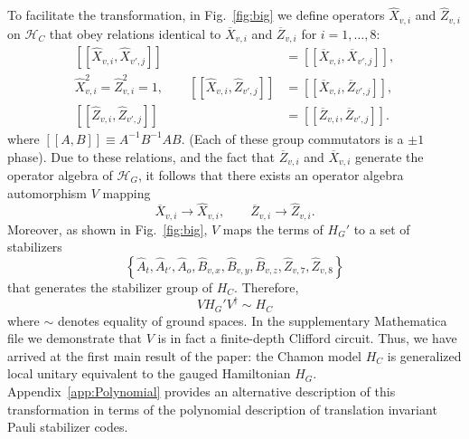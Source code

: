 \documentclass[prx,twocolumn,superscriptaddress,nofootinbib,showpacs,notitlepage]{revtex4-2}
\newcommand{\Chamon}{Chamon }
\begin{document}
To facilitate the transformation, in Fig.~\ref{fig:big} we define operators $\widehat{X}_{v,i}$ and $\widehat{Z}_{v,i}$ on $\mathcal{H}_C$ that obey relations identical to $\overline{X}_{v,i}$ and $\overline{Z}_{v,i}$ for $i=1,\ldots,8$:
\begin{equation}
\begin{split}
    [[\widehat{X}_{v,i},\widehat{X}_{v',j}]]&=[[\overline{X}_{v,i},\overline{X}_{v',j}]],\\
    \widehat{X}_{v,i}^2=\widehat{Z}_{v,i}^2=1,\qquad
    [[\widehat{X}_{v,i},\widehat{Z}_{v',j}]]&=[[\overline{X}_{v,i},\overline{Z}_{v',j}]],\\
    [[\widehat{Z}_{v,i},\widehat{Z}_{v',j}]]&=[[\overline{Z}_{v,i},\overline{Z}_{v',j}]].
\end{split}
\end{equation}
where $[[A,B]]\equiv A^{-1}B^{-1}AB$. (Each of these group commutators is a $\pm1$ phase). Due to these relations, and the fact that $\overline{Z}_{v,i}$ and $\overline{X}_{v,i}$ generate the operator algebra of $\mathcal{H}_G$, it follows that there exists an operator algebra automorphism $V$ mapping
\begin{equation}
     \overline{X}_{v,i}\to \widehat{X}_{v,i},\qquad \overline{Z}_{v,i}\to \widehat{Z}_{v,i}.
\end{equation}
Moreover, as shown in Fig.~\ref{fig:big}, $V$ maps the terms of $H_G'$ to a set of stabilizers
\begin{equation}
    \left\{\widehat{A}_t,\widehat{A}_{t'},\widehat{A}_o,\widehat{B}_{v,x},\widehat{B}_{v,y},\widehat{B}_{v,z},\widehat{Z}_{v,7},\widehat{Z}_{v,8}\right\}
\end{equation}
that generates the stabilizer group of $H_C$. Therefore,
\begin{equation}
    VH_G'V^\dagger\sim H_C
\end{equation}
where $\sim$ denotes equality of ground spaces. In the supplementary Mathematica file we demonstrate that $V$ is in fact a finite-depth Clifford circuit.
Thus, we have arrived at the first main result of the paper: the \Chamon model $H_C$ is generalized local unitary equivalent to the gauged Hamiltonian $H_G$. Appendix~\ref{app:Polynomial} provides an alternative description of this transformation in terms of the polynomial description of translation invariant Pauli stabilizer codes.
\end{document}
